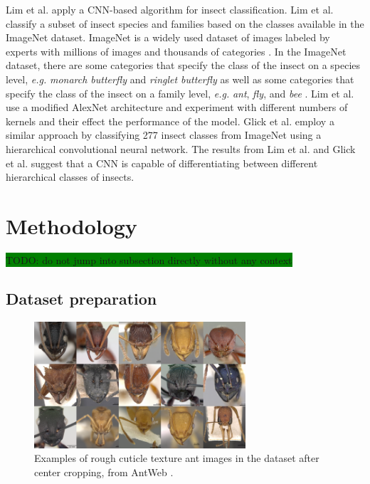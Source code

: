 \documentclass{aci}
\numberwithin{equation}{section}
\begin{document}
Lim et al. \cite{lim_performance_2017} apply a CNN-based algorithm for insect
classification. Lim et al. \cite{lim_performance_2017} classify a subset of
insect species and families based on the classes available in the ImageNet
dataset. ImageNet is a widely used dataset of images labeled by experts with
millions of images and thousands of categories \cite{deng_imagenet_2009}. In the
ImageNet dataset, there are some categories that specify the class of the insect
on a species level, \textit{e.g.} \textit{monarch butterfly} and \textit{ringlet
    butterfly} as well as some categories that specify the class of the insect on a
family level, \textit{e.g.} \textit{ant}, \textit{fly}, and \textit{bee}
\cite{imagenet_labels}. Lim et al. \cite{lim_performance_2017} use a modified
AlexNet architecture and experiment with different numbers of kernels and their
effect the performance of the model. Glick et al. \cite{glick_insect_2016}
employ a similar approach by classifying 277 insect classes from ImageNet using
a hierarchical convolutional neural network. The results from Lim et al.
\cite{lim_performance_2017} and Glick et al. \cite{glick_insect_2016} suggest
that a CNN is capable of differentiating between different hierarchical classes
of insects.

\section{Methodology}

\colorbox{green}{TODO: do not jump into subsection directly without any context}

\subsection{Dataset preparation} %

\begin{figure}[h]
    \centering
    \includegraphics[width=0.7\textwidth]{thesis_assets/images/rough_collage.png}
    \caption{Examples of rough cuticle texture ant images in the dataset after
        center cropping, from AntWeb \cite{perrichot_antweb_2012}.}
    \label{fig:rough-cuticle-texture}
\end{figure}
\end{document}

